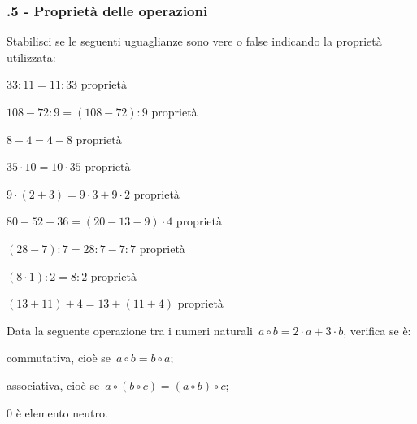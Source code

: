 \subsubsection*{\thechapter.5 - Proprietà delle operazioni}
\begin{esercizio}
\label{ese:1.8}
 Stabilisci se le seguenti uguaglianze sono vere o false indicando la proprietà utilizzata:
\TabPositions{5cm}
 \begin{enumeratea}
 \item $33:11=11:33$			\tab proprietà\dotfill\:\boxV\qquad\boxF
 \item $108-72:9=(108-72):9$		\tab proprietà\dotfill\:\boxV\qquad\boxF
 \item $8-4=4-8$			\tab proprietà\dotfill\:\boxV\qquad\boxF
 \item $35\cdot 10=10\cdot 35$	\tab proprietà\dotfill\:\boxV\qquad\boxF
 \item $9\cdot(2+3)=9\cdot3+9\cdot2$ \tab proprietà\dotfill\:\boxV\qquad\boxF
 \item $80-52+36=(20-13-9)\cdot 4$ 	\tab proprietà\dotfill\:\boxV\qquad\boxF
 \item $(28-7):7=28:7-7:7$		\tab proprietà\dotfill\:\boxV\qquad\boxF
 \item $(8\cdot 1):2=8:2$		\tab proprietà\dotfill\:\boxV\qquad\boxF
 \item $(13+11)+4=13+(11+4)$		\tab proprietà\dotfill\:\boxV\qquad\boxF
 \end{enumeratea}
\end{esercizio}

\begin{esercizio}
\label{ese:1.9}
Data la seguente operazione tra i numeri naturali~$a\circ b=2\cdot a +3\cdot b$, verifica se è:
 \begin{enumeratea}
 \item commutativa, cioè se~$a\circ b=b\circ a$;
 \item associativa, cioè se~$a\circ (b\circ c)=(a\circ b)\circ c$;
 \item 0 è elemento neutro.
 \end{enumeratea}
\end{esercizio}

